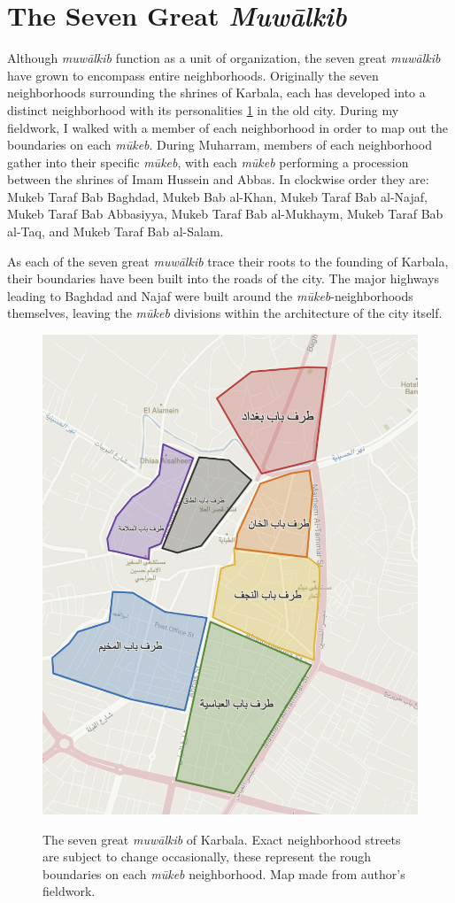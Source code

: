 \section{The Seven Great \emph{Muwālkib}} \label{seven-great-mokwebs}
Although \emph{muwālkib} function as a unit of organization, the seven great \emph{muwālkib} have grown to encompass entire neighborhoods. Originally the seven neighborhoods surrounding the shrines of Karbala, each has developed into a distinct neighborhood with its personalities \ref{fig:mowalkib} in the old city. During my fieldwork, I walked with a member of each neighborhood in order to map out the boundaries on each \emph{mūkeb}. During Muharram, members of each neighborhood gather into their specific \emph{mūkeb}, with each \emph{mūkeb} performing a procession between the shrines of Imam Hussein and Abbas. In clockwise order they are:  Mukeb Taraf Bab Baghdad, Mukeb Bab al-Khan, Mukeb Taraf Bab al-Najaf, Mukeb Taraf Bab Abbasiyya, Mukeb Taraf Bab al-Mukhaym, Mukeb Taraf Bab al-Taq, and Mukeb Taraf Bab al-Salam.

As each of the seven great \emph{muwālkib} trace their roots to the founding of Karbala, their boundaries have been built into the roads of the city. The major highways leading to Baghdad and Najaf were built around the \emph{mūkeb}-neighborhoods themselves, leaving the \emph{mūkeb} divisions within the architecture of the city itself. 

\begin{figure}[H]
\caption{The seven great \emph{muwālkib} of Karbala. Exact neighborhood streets are subject to change occasionally, these represent the rough boundaries on each \emph{mūkeb} neighborhood. Map made from author's fieldwork.}
\centering
\includegraphics[height=0.75\textwidth]{images/seven-mowkebs.png}
\label{fig:mowalkib}
\end{figure}

